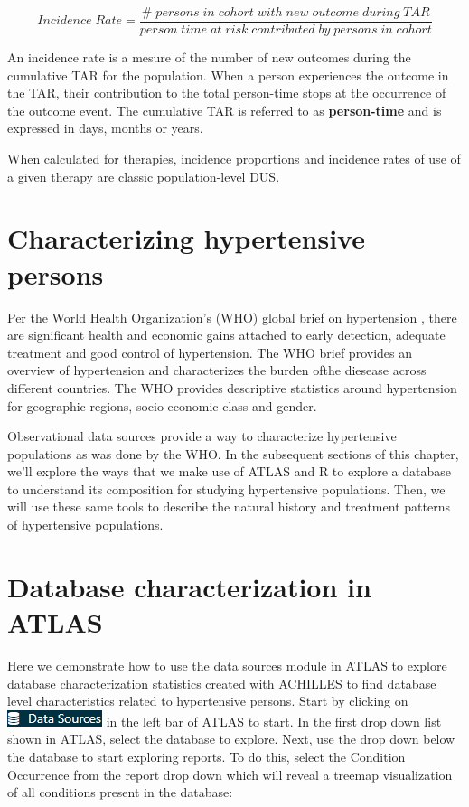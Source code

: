 \documentclass[11pt]{book}
\theoremstyle{definition}
\theoremstyle{definition}
\theoremstyle{definition}
\theoremstyle{remark}
\begin{document}
\[
Incidence\;Rate = \frac{\#\;persons\;in\;cohort\;with\;new\;outcome\;during\;TAR}{person\;time\;at\;risk\;contributed\;by\;persons\;in\;cohort}
\]

An incidence rate is a mesure of the number of new outcomes during the cumulative TAR for the population. When a person experiences the outcome in the TAR, their contribution to the total person-time stops at the occurrence of the outcome event. The cumulative TAR is referred to as \textbf{person-time} and is expressed in days, months or years. 

When calculated for therapies, incidence proportions and incidence rates of use of a given therapy are classic population-level DUS.

\hypertarget{characterizing-hypertensive-persons}{%
\section{Characterizing hypertensive persons}\label{characterizing-hypertensive-persons}}

Per the World Health Organization's (WHO) global brief on hypertension \citep{WHOHypertension}, there are significant health and economic gains attached to early detection, adequate treatment and good control of hypertension. The WHO brief provides an overview of hypertension and characterizes the burden ofthe diesease across different countries. The WHO provides descriptive statistics around hypertension for geographic regions, socio-economic class and gender.

Observational data sources provide a way to characterize hypertensive populations as was done by the WHO. In the subsequent sections of this chapter, we'll explore the ways that we make use of ATLAS and R to explore a database to understand its composition for studying hypertensive populations. Then, we will use these same tools to describe the natural history and treatment patterns of hypertensive populations.

\hypertarget{database-characterization-in-atlas}{%
\section{Database characterization in ATLAS}\label{database-characterization-in-atlas}}

Here we demonstrate how to use the data sources module in ATLAS to explore database characterization statistics created with \href{https://github.com/OHDSI/Achilles}{ACHILLES} to find database level characteristics related to hypertensive persons. Start by clicking on \includegraphics{images/Characterization/atlasDataSourcesMenuItem.png} in the left bar of ATLAS to start. In the first drop down list shown in ATLAS, select the database to explore. Next, use the drop down below the database to start exploring reports. To do this, select the Condition Occurrence from the report drop down which will reveal a treemap visualization of all conditions present in the database:
\end{document}

